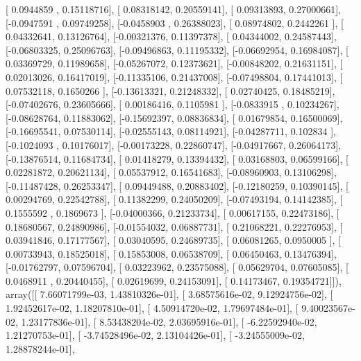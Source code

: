 \documentclass{article}
\begin{document}
       [ 0.0944859 ,  0.15118716],
       [ 0.08318142,  0.20559141],
       [ 0.09313893,  0.27000661],
       [-0.0947591 ,  0.09749258],
       [-0.0458903 ,  0.26388023],
       [ 0.08974802,  0.2442261 ],
       [ 0.04332641,  0.13126764],
       [-0.00321376,  0.11397378],
       [ 0.04344002,  0.24587443],
       [-0.06803325,  0.25096763],
       [-0.09496863,  0.11195332],
       [-0.06692954,  0.16984087],
       [ 0.03369729,  0.11989658],
       [-0.05267072,  0.12373621],
       [-0.00848202,  0.21631151],
       [ 0.02013026,  0.16417019],
       [-0.11335106,  0.21437008],
       [-0.07498804,  0.17441013],
       [ 0.07532118,  0.1650266 ],
       [-0.13613321,  0.21248332],
       [ 0.02740425,  0.18485219],
       [-0.07402676,  0.23605666],
       [ 0.00186416,  0.1105981 ],
       [-0.0833915 ,  0.10234267],
       [-0.08628764,  0.11883062],
       [-0.15692397,  0.08836834],
       [ 0.01679854,  0.16500069],
       [-0.16695541,  0.07530114],
       [-0.02555143,  0.08114921],
       [-0.04287711,  0.102834  ],
       [-0.1024093 ,  0.10176017],
       [-0.00173228,  0.22860747],
       [-0.04917667,  0.26064173],
       [-0.13876514,  0.11684734],
       [ 0.01418279,  0.13394432],
       [ 0.03168803,  0.06599166],
       [ 0.02281872,  0.20621134],
       [ 0.05537912,  0.16541683],
       [-0.08960903,  0.13106298],
       [-0.11487428,  0.26253347],
       [ 0.09449488,  0.20883402],
       [-0.12180259,  0.10390145],
       [ 0.00294769,  0.22542788],
       [ 0.11382299,  0.24050209],
       [-0.07493194,  0.14142385],
       [ 0.1555592 ,  0.1869673 ],
       [-0.04000366,  0.21233734],
       [ 0.00617155,  0.22473186],
       [ 0.18680567,  0.24890986],
       [-0.01554032,  0.06887731],
       [ 0.21068221,  0.22276953],
       [ 0.03941846,  0.17177567],
       [ 0.03040595,  0.24689735],
       [ 0.06081265,  0.0950005 ],
       [ 0.00733943,  0.18525018],
       [ 0.15853008,  0.06538709],
       [ 0.06450463,  0.13476394],
       [-0.01762797,  0.07596704],
       [ 0.03223962,  0.23575088],
       [ 0.05629704,  0.07605085],
       [ 0.0468911 ,  0.20440455],
       [ 0.02619699,  0.24153091],
       [ 0.14173467,  0.19354721]]), array([[  7.66071799e-03,   1.43810326e-01],
       [  3.68575616e-02,   9.12924756e-02],
       [  1.92452617e-02,   1.18207810e-01],
       [  4.50914720e-02,   1.79697484e-01],
       [  9.40023567e-02,   1.23177836e-01],
       [  8.53438204e-02,   2.03695916e-01],
       [ -6.22592940e-02,   1.21270753e-01],
       [ -3.74528496e-02,   2.13104426e-01],
       [ -3.24555009e-02,   1.28878244e-01],
\end{document}
